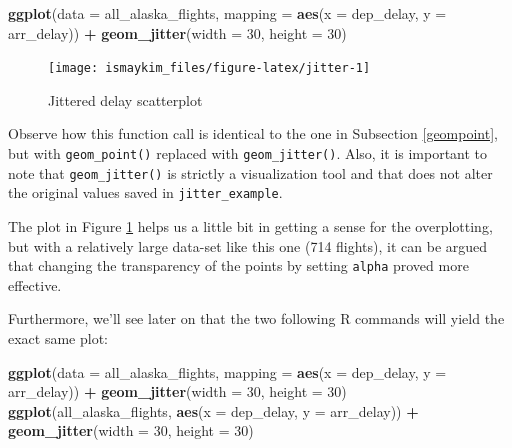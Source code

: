 \documentclass[12pt,]{krantz}
\makeatletter
\newenvironment{Shaded}{\begin{snugshade}}{\end{snugshade}}
\newcommand{\KeywordTok}[1]{\textcolor[rgb]{0.27,0.27,0.27}{\textbf{#1}}}
\newcommand{\DataTypeTok}[1]{\textcolor[rgb]{0.27,0.27,0.27}{#1}}
\newcommand{\DecValTok}[1]{\textcolor[rgb]{0.06,0.06,0.06}{#1}}
\newcommand{\StringTok}[1]{\textcolor[rgb]{0.5,0.5,0.5}{#1}}
\newcommand{\OperatorTok}[1]{\textcolor[rgb]{0.43,0.43,0.43}{\textbf{#1}}}
\newcommand{\NormalTok}[1]{#1}
\newenvironment{kframe}{%
\medskip{}
\setlength{\fboxsep}{.8em}
 \def\at@end@of@kframe{}%
 \ifinner\ifhmode%
  \def\at@end@of@kframe{\end{minipage}}%
  \begin{minipage}{\columnwidth}%
 \fi\fi%
 \def\FrameCommand##1{\hskip\@totalleftmargin \hskip-\fboxsep
 \colorbox{shadecolor}{##1}\hskip-\fboxsep
     \hskip-\linewidth \hskip-\@totalleftmargin \hskip\columnwidth}%
 \MakeFramed {\advance\hsize-\width
   \@totalleftmargin\z@ \linewidth\hsize
   \@setminipage}}%
 {\par\unskip\endMakeFramed%
 \at@end@of@kframe}
\renewenvironment{Shaded}{\begin{kframe}}{\end{kframe}}
\makeatother
\begin{document}
\begin{Shaded}
\begin{Highlighting}[]
\KeywordTok{ggplot}\NormalTok{(}\DataTypeTok{data =}\NormalTok{ all_alaska_flights, }
       \DataTypeTok{mapping =} \KeywordTok{aes}\NormalTok{(}\DataTypeTok{x =}\NormalTok{ dep_delay, }\DataTypeTok{y =}\NormalTok{ arr_delay)) }\OperatorTok{+}\StringTok{ }
\StringTok{  }\KeywordTok{geom_jitter}\NormalTok{(}\DataTypeTok{width =} \DecValTok{30}\NormalTok{, }\DataTypeTok{height =} \DecValTok{30}\NormalTok{)}
\end{Highlighting}
\end{Shaded}

\begin{figure}

{\centering \texttt{[image: ismaykim\_files/figure-latex/jitter-1]} 

}

\caption{Jittered delay scatterplot}\label{fig:jitter}
\end{figure}

Observe how this function call is identical to the one in Subsection
\ref{geompoint}, but with \texttt{geom\_point()} replaced with
\texttt{geom\_jitter()}. Also, it is important to note that
\texttt{geom\_jitter()} is strictly a visualization tool and that does
not alter the original values saved in \texttt{jitter\_example}.

The plot in Figure \ref{fig:jitter} helps us a little bit in getting a
sense for the overplotting, but with a relatively large data-set like
this one (714 flights), it can be argued that changing the transparency
of the points by setting \texttt{alpha} proved more effective.

Furthermore, we'll see later on that the two following R commands will
yield the exact same plot:

\begin{Shaded}
\begin{Highlighting}[]
\KeywordTok{ggplot}\NormalTok{(}\DataTypeTok{data =}\NormalTok{ all_alaska_flights, }
       \DataTypeTok{mapping =} \KeywordTok{aes}\NormalTok{(}\DataTypeTok{x =}\NormalTok{ dep_delay, }\DataTypeTok{y =}\NormalTok{ arr_delay)) }\OperatorTok{+}\StringTok{ }
\StringTok{  }\KeywordTok{geom_jitter}\NormalTok{(}\DataTypeTok{width =} \DecValTok{30}\NormalTok{, }\DataTypeTok{height =} \DecValTok{30}\NormalTok{)}
\KeywordTok{ggplot}\NormalTok{(all_alaska_flights, }\KeywordTok{aes}\NormalTok{(}\DataTypeTok{x =}\NormalTok{ dep_delay, }\DataTypeTok{y =}\NormalTok{ arr_delay)) }\OperatorTok{+}\StringTok{ }
\StringTok{  }\KeywordTok{geom_jitter}\NormalTok{(}\DataTypeTok{width =} \DecValTok{30}\NormalTok{, }\DataTypeTok{height =} \DecValTok{30}\NormalTok{)}
\end{Highlighting}
\end{Shaded}
\end{document}
